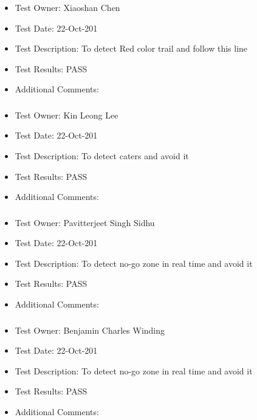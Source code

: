 \documentclass[10pt,a4paper,titlepage]{article}
\begin{document}
	\subsubsection{}
\begin{itemize}
\item Test Owner:  Xiaoshan Chen
\item Test Date: 22-Oct-201
\item Test Description: To detect Red color trail and follow this line
\item Test Results: PASS
\item Additional Comments:	
\end{itemize}

	\subsubsection{}
\begin{itemize}
\item Test Owner:  Kin Leong Lee
\item Test Date: 22-Oct-201
\item Test Description: To detect caters and avoid it
\item Test Results: PASS
\item Additional Comments:

\end{itemize}

	\subsubsection{}
\begin{itemize}
\item Test Owner:  Pavitterjeet Singh Sidhu
\item Test Date: 22-Oct-201
\item Test Description: To detect no-go zone in real time and avoid it
\item Test Results: PASS
\item Additional Comments:	
\end{itemize}

	\subsubsection{}
\begin{itemize}
\item Test Owner: Benjamin Charles Winding
\item Test Date: 22-Oct-201
\item Test Description: To detect no-go zone in real time and avoid it
\item Test Results: PASS
\item Additional Comments:

\end{itemize}
\end{document}
